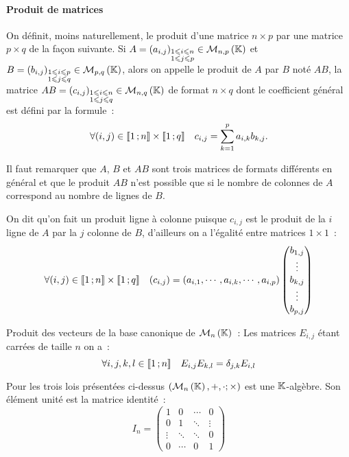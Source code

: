 \paragraph{Produit de matrices}
On définit, moins naturellement, le produit d'une matrice $n \times p$ par une matrice $p \times q$ de la façon suivante. Si $A  = (a_{i,j})_{\substack{1\leqslant i \leqslant n \\ 1 \leqslant j \leqslant p}} \in \mathcal{M}_{n,p}\left(\mathbb{K}\right)$ et $B  = (b_{i,j})_{\substack{1\leqslant i \leqslant p \\ 1 \leqslant j \leqslant q}} \in \mathcal{M}_{p,q}\left(\mathbb{K}\right)$, alors on appelle le produit de $A$ par $B$ noté $AB$, la matrice $AB=(c_{i,j})_{\substack{1\leqslant i \leqslant n \\ 1\leqslant j \leqslant q}} \in \mathcal{M}_{n,q}\left(\mathbb{K}\right)$ de format $n \times q$ dont le coefficient général est défini par la formule~:
\begin{equation}
	\forall (i,j) \in \mathopen{\llbracket}1\mathclose{}\mathpunct{};n\mathclose{\rrbracket} \times \mathopen{\llbracket}1\mathclose{}\mathpunct{};q\mathclose{\rrbracket} \quad c_{i,j} = \sum_{k=1}^p a_{i,k}b_{k,j}.
\end{equation}

Il faut remarquer que $A$, $B$ et $AB$ sont trois matrices de formats différents en général et que le produit $AB$ n'est possible que si le nombre de colonnes de $A$ correspond au nombre de lignes de $B$.

On dit qu'on fait un produit ligne à colonne puisque $c_{i,j}$ est le produit de la $i$\ieme{} ligne de $A$ par la $j$\ieme{} colonne de $B$, d'ailleurs on a l'égalité entre matrices $1 \times 1$~:
\begin{equation}
	\forall (i,j) \in \mathopen{\llbracket}1\mathclose{}\mathpunct{};n\mathclose{\rrbracket} \times \mathopen{\llbracket}1\mathclose{}\mathpunct{};q\mathclose{\rrbracket} \quad (c_{i,j}) = (a_{i,1}, \cdots, a_{i,k}, \cdots, a_{i,p}) \begin{pmatrix} b_{1,j} \\ \vdots \\b_{k,j} \\ \vdots \\b_{p,j} \end{pmatrix}
\end{equation}

Produit des vecteurs de la base canonique de $\mathcal{M}_{n}\left(\mathbb{K}\right)$~: Les matrices $E_{i,j}$ étant carrées de taille $n$ on a~:
\begin{equation}
	\forall i,j,k,l \in \mathopen{\llbracket}1\mathclose{}\mathpunct{};n\mathclose{\rrbracket} \quad E_{i,j}E_{k,l} = \delta_{j,k} E_{i,l}
\end{equation}

Pour les trois lois présentées ci-dessus $(\mathcal{M}_{n}\left(\mathbb{K}\right),+,\cdot;\times)$ est une $\mathbb{K}$-algèbre. Son élément unité est la matrice identité~:
\begin{equation}
	I_n = \begin{pmatrix}
		1 & 0 & \cdots & 0 \\
		0 & 1 & \ddots & \vdots \\
		\vdots & \ddots & \ddots & 0 \\
		0 & \cdots & 0 & 1
	\end{pmatrix}
\end{equation}


